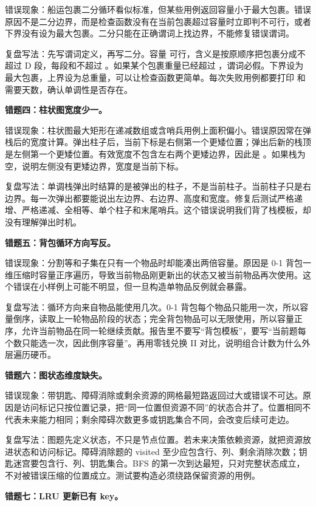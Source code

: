 错误现象：船运包裹二分循环看似标准，但某些用例返回容量小于最大包裹。错误原因不是二分边界，而是检查函数没有在当前包裹超过容量时立即判不可行，或者下界没有设为最大包裹。二分只能在正确谓词上找边界，不能修复错误谓词。

复盘写法：先写谓词定义，再写二分。容量  可行，含义是按原顺序把包裹分成不超过 D 段，每段和不超过 。如果某个包裹重量已经超过 ，谓词必假。下界设为最大包裹，上界设为总重量，可以让检查函数更简单。每次失败用例都要打印  和需要天数，确认单调性是否存在。

\noindent\textbf{错题四：柱状图宽度少一。}

错误现象：柱状图最大矩形在递减数组或含哨兵用例上面积偏小。错误原因常在弹栈后的宽度计算。弹出柱子后，当前下标是右侧第一个更矮位置；弹出后新的栈顶是左侧第一个更矮位置。有效宽度不包含左右两个更矮边界，因此是 。如果栈为空，说明左侧没有更矮边界，宽度是当前下标。

复盘写法：单调栈弹出时结算的是被弹出的柱子，不是当前柱子。当前柱子只是右边界。每一次弹出都要能说出左边界、右边界、高度和宽度。修复后测试严格递增、严格递减、全相等、单个柱子和末尾哨兵。这个错误说明我们背了栈模板，却没有理解弹出时机。

\noindent\textbf{错题五：背包循环方向写反。}

错误现象：分割等和子集在只有一个物品时却能凑出两倍容量。原因是 0-1 背包一维压缩时容量正序遍历，导致当前物品刚更新出的状态又被当前物品再次使用。这个错误在小样例上可能不明显，但一旦构造单物品反例就会暴露。

复盘写法：循环方向来自物品能使用几次。0-1 背包每个物品只能用一次，所以容量倒序，读取上一轮物品阶段的状态；完全背包物品可以无限使用，所以容量正序，允许当前物品在同一轮继续贡献。报告里不要写“背包模板”，要写“当前题每个数只能选一次，因此倒序容量”。再用零钱兑换 II 对比，说明组合计数为什么外层遍历硬币。

\noindent\textbf{错题六：图状态维度缺失。}

错误现象：带钥匙、障碍消除或剩余资源的网格最短路返回过大或错误不可达。原因是访问标记只按位置记录，把“同一位置但资源不同”的状态合并了。位置相同不代表未来能力相同；剩余障碍次数更多或钥匙集合不同，会改变后续可走边。

复盘写法：图题先定义状态，不只是节点位置。若未来决策依赖资源，就把资源放进状态和访问标记。障碍消除题的 visited 至少应包含行、列、剩余消除次数；钥匙迷宫要包含行、列、钥匙集合。BFS 的第一次到达最短，只对完整状态成立，不对被错误压缩的位置成立。测试要构造必须绕路保留资源的用例。

\noindent\textbf{错题七：LRU 更新已有 key。}

